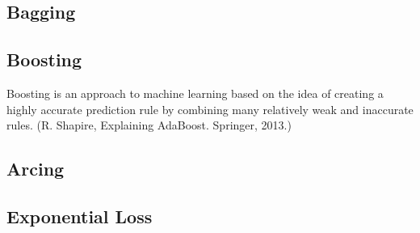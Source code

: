 \documentclass[main]{subfiles}
\begin{document}
\subsection{Bagging}
\subsection{Boosting}
Boosting is an approach to machine learning based on the idea of creating a highly accurate prediction rule by combining many relatively weak and inaccurate rules. (R. Shapire, Explaining AdaBoost. Springer, 2013.)
\subsection{Arcing}
\subsection{Exponential Loss}
\end{document}
